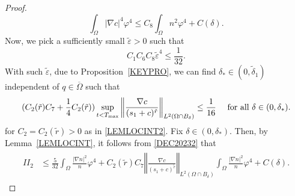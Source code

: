 \documentclass{amsart}
\numberwithin{equation}{section}
\newcommand{\norm}[1]{\left\Vert #1 \right\Vert}
\begin{document}
\begin{proof}
\begin{equation}
\int_{\Omega}|\nabla c|^{4}\varphi^{4} \le C_{8}\int_{\Omega}n^{2}\varphi^{4} +C(\delta).
\end{equation}
Now, we pick a sufficiently small $\tilde{\varepsilon}>0$ such that 
\begin{equation}\label{DEC26104}
C_{1}C_{6} C_{8}\tilde{\varepsilon}^{4}\le \frac{1}{32}.
\end{equation}
With such $\tilde{\varepsilon}$, due to Proposition~\ref{KEYPRO}, we can find $\delta_{*} \in (0, \tilde{\delta}_1)$ independent of $q\in\overline{\Omega}$ such that
\begin{equation}\label{DEC26105}
(C_{2}(\tilde{r}) C_{7}+\frac{1}{4}C_{2}(\tilde{r}))\sup_{t<T_{\rm max}}\norm{\frac{\nabla c}{(s_{1}+c)^{\tilde{r}}}}_{L^{2}(\Omega\cap B_{\delta})}\le \frac{1}{16}\quad \mbox{ for all } \delta \in (0, \delta_{*}).
\end{equation}
for $C_2 = C_2 (\tilde{r}) >0$ as in \eqref{LEMLOCINT2}.
Fix $\delta \in (0, \delta_{*})$. Then, by Lemma~\ref{LEMLOCINT}, it follows from \eqref{DEC20232} that
\begin{align}\label{DEC23326}
\begin{aligned}
II_2
&\le \frac{5}{32} \int_{\Omega} \frac{|\nabla n|^{2}}{n}\varphi^{4} +C_{2}(\tilde{r}) C_{7} \norm{\frac{\nabla c}{(s_{1}+c)^{\tilde{r}}}}_{L^{2}(\Omega\cap B_{\delta})}\int_{\Omega} \frac{|\nabla n|^{2}}{n}\varphi^{4}+C(\delta).
\end{aligned}
\end{align}
 

\end{proof}
\end{document}
